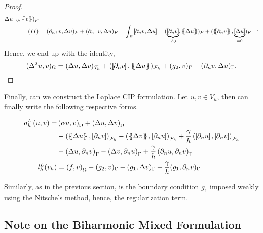\begin{proof}
\[\begin{split}
{{    \Delta u }}_{=0}  , \mean{v  }     )_{ F} \\
    (II) &=  ( \partial _{n^{+}} v, \Delta u) _{F} + ( \partial _{n^{-}} v, \Delta u) _{F} = \int_{F}^{} \jump{ \partial _{n} v, \Delta u } =  ( \underbrace{\jump{ \partial _{n} v}}_{ \neq 0 } , \mean{ \Delta u })_{F}  + ( \mean{ \partial _{n} v}, \underbrace{\jump{ \Delta u
    }}_{=0} )_{F}
\end{split} .
\]
Hence, we end up with the identity,
\[
( \Delta ^2 u, v ) _{\Omega } = ( \Delta u, \Delta v)_{\mathcal{T} _{h} }  +  ( \jump{ \partial _{n} v} , \mean{ \Delta u })_{\mathcal{F}_{h} }  + ( g_{2} , v )_{\Gamma } - ( \partial _{n} v, \Delta u)_{\Gamma }.
\]


\end{proof}
Finally, can we construct the Laplace CIP formulation. Let $u,v \in V_{h}$, then can finally write the following respective forms.

\begin{equation}
    \begin{split}
        a_{h}^{L} \left( u, v \right)   =&
        \left( \alpha  u, v \right) _{\Omega }   +  \left( \Delta  u, \Delta v \right) _{ \Omega } \\
                                         & - \left( \mean{  \Delta  u }, \jump{ \partial _{n }v} \right)_{\mathcal{F}_{h}  }  - \left( \mean{ \Delta  v }, \jump{ \partial _{n}u }      \right)_{\mathcal{F}_{h}  }  + \frac{\gamma }{h}  \left( \jump{ \partial _{n} u}, \jump{ \partial _{n} v   }   \right)_{\mathcal{F}_{h} } \\
                                         & - \left(   \Delta  u ,  \partial _{n }v \right)_{\Gamma   }  - \left(  \Delta  v ,  \partial _{n}u       \right)_{\Gamma  }  + \frac{\gamma }{h}  \left(  \partial _{n} u,  \partial _{n} v      \right)_{ \Gamma } \\
        l^{L}_{h}( v_{h}) & =  \left( f, v \right) _{\Omega } - ( g_{2},  v )_{\Gamma } -  ( g_{1}, \Delta  v  )_{\Gamma }  + \frac{\gamma }{h} ( g_{1}, \partial _{n} v  )_{\Gamma }
    \end{split}
\end{equation}


Similarly, as in the previous section, is the boundary condition $g_{1}$ imposed weakly using the Nitsche's method, hence, the regularization term.


\subsection{Note on the Biharmonic Mixed Formulation}%
\label{subsec:biharmonic_mixed_formulation}

